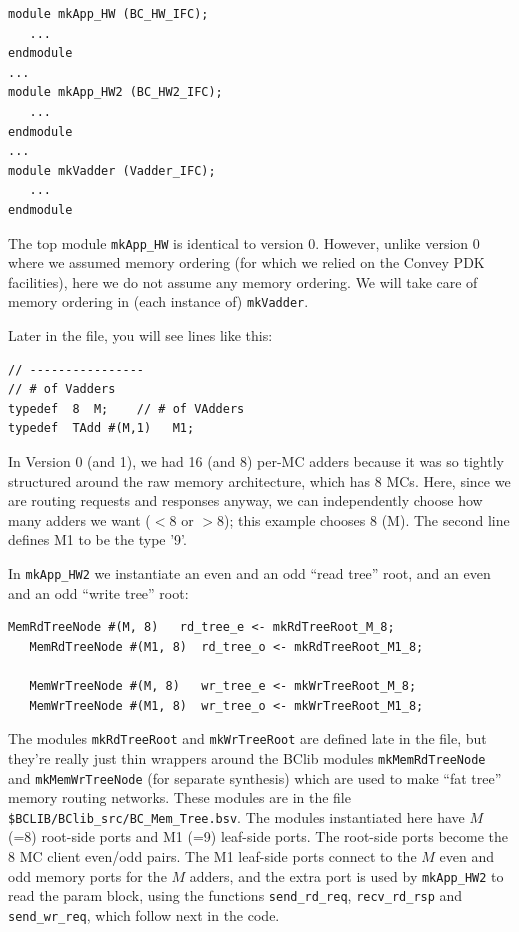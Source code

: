\documentclass[twoside,letterpaper,11pt]{article}
\begin{document}
\begin{Verbatim}[frame=single, label=App\_HW\_v2.bsv] 
module mkApp_HW (BC_HW_IFC);
   ...
endmodule
...
module mkApp_HW2 (BC_HW2_IFC);
   ...
endmodule
...
module mkVadder (Vadder_IFC);
   ...
endmodule
\end{Verbatim}

The top module \verb|mkApp_HW| is identical to version 0.  However,
unlike version 0 where we assumed memory ordering (for which we relied
on the Convey PDK facilities), here we do not assume any memory
ordering.  We will take care of memory ordering in (each instance of)
\verb|mkVadder|.

Later in the file, you will see lines like this:
\begin{Verbatim}[frame=single, label=App\_HW\_v2.bsv] 
// ----------------
// # of Vadders
typedef  8  M;    // # of VAdders
typedef  TAdd #(M,1)   M1;
\end{Verbatim}
In Version 0 (and 1), we had 16 (and 8) per-MC adders because it was
so tightly structured around the raw memory architecture, which has 8
MCs.  Here, since we are routing requests and responses anyway, we can
independently choose how many adders we want ($< 8$ or $> 8$); this
example chooses 8 (M).  The second line defines M1 to be the type '9'.

In \verb|mkApp_HW2| we instantiate an even and an odd ``read tree''
root, and an even and an odd ``write tree'' root:

\begin{Verbatim}[frame=single, label=App\_HW\_v2.bsv] 
   MemRdTreeNode #(M, 8)   rd_tree_e <- mkRdTreeRoot_M_8;
   MemRdTreeNode #(M1, 8)  rd_tree_o <- mkRdTreeRoot_M1_8;

   MemWrTreeNode #(M, 8)   wr_tree_e <- mkWrTreeRoot_M_8;
   MemWrTreeNode #(M1, 8)  wr_tree_o <- mkWrTreeRoot_M1_8;
\end{Verbatim}

The modules \verb|mkRdTreeRoot| and \verb|mkWrTreeRoot| are defined
late in the file, but they're really just thin wrappers around the
BClib modules \verb|mkMemRdTreeNode| and \verb|mkMemWrTreeNode| (for
separate synthesis) which are used to make ``fat tree'' memory routing
networks.  These modules are in the file
\verb|$BCLIB/BClib_src/BC_Mem_Tree.bsv|.  The modules instantiated
here have $M$ (=8) root-side ports and M1 (=9) leaf-side ports.  The root-side
ports become the 8 MC client even/odd pairs. The M1
leaf-side ports connect to the $M$ even and odd memory ports for the $M$
adders, and the extra port is used by \verb|mkApp_HW2| to read the
param block, using the functions \verb|send_rd_req|,
\verb|recv_rd_rsp| and \verb|send_wr_req|, which follow next in the
code.
\end{document}
